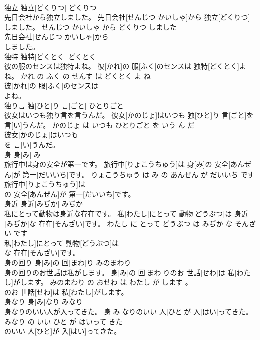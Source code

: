 \documentclass[8pt]{extreport}
\begin{document}
\begin{CJK}{UTF8}{min}
\\	独立	独立[どくりつ]	どくりつ	
\\	先日会社から独立しました。	先日会社[せんじつ かいしゃ]から 独立[どくりつ]しました。	せんじつ かいしゃ から どくりつ しました	
\\	先日会社[せんじつ かいしゃ]から
\\	しました。			
\\	独特	独特[どくとく]	どくとく	
\\	彼の服のセンスは独特よね。	彼[かれ]の 服[ふく]のセンスは 独特[どくとく]よね。	かれ の ふく の せんす は どくとく よ ね	
\\	彼[かれ]の 服[ふく]のセンスは
\\	よね。			
\\	独り言	独[ひと]り 言[ごと]	ひとりごと	
\\	彼女はいつも独り言を言うんだ。	彼女[かのじょ]はいつも 独[ひと]り 言[ごと]を 言[い]うんだ。	かのじょ は いつも ひとりごと を いう ん だ	
\\	彼女[かのじょ]はいつも
\\	を 言[い]うんだ。			
\\	身	身[み]	み	
\\	旅行中は身の安全が第一です。	旅行中[りょこうちゅう]は 身[み]の 安全[あんぜん]が 第一[だいいち]です。	りょこうちゅう は み の あんぜん が だいいち です	
\\	旅行中[りょこうちゅう]は
\\	の 安全[あんぜん]が 第一[だいいち]です。			
\\	身近	身近[みぢか]	みぢか	
\\	私にとって動物は身近な存在です。	私[わたし]にとって 動物[どうぶつ]は 身近[みぢか]な 存在[そんざい]です。	わたし に とって どうぶつ は みぢか な そんざい です	
\\	私[わたし]にとって 動物[どうぶつ]は
\\	な 存在[そんざい]です。			
\\	身の回り	身[み]の 回[まわ]り	みのまわり	
\\	身の回りのお世話は私がします。	身[み]の 回[まわ]りのお 世話[せわ]は 私[わたし]がします。	みのまわり の おせわ は わたし が します 。	
\\	のお 世話[せわ]は 私[わたし]がします。			
\\	身なり	身[み]なり	みなり	
\\	身なりのいい人が入ってきた。	身[み]なりのいい 人[ひと]が 入[はい]ってきた。	みなり の いい ひと が はいって きた	
\\	のいい 人[ひと]が 入[はい]ってきた。			

\end{CJK}
\end{document}
